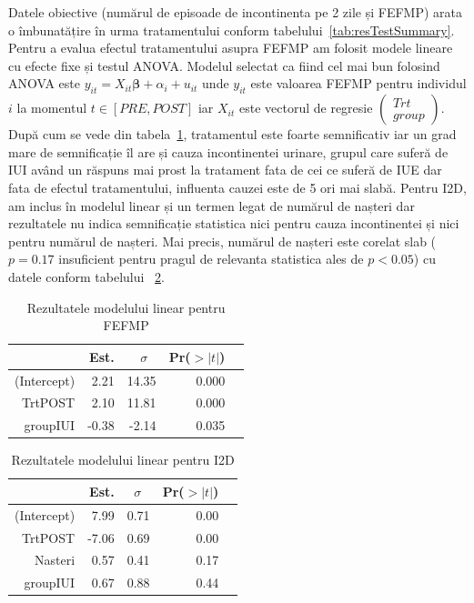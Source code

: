 \documentclass[12pt]{article}
\begin{document}
  Datele obiective (numărul de episoade de incontinenta pe 2 zile și \ac{FEFMP}) arata o îmbunatățire în urma tratamentului conform tabelului~\ref{tab:resTestSummary}. Pentru a evalua efectul tratamentului asupra \ac{FEFMP} am folosit modele lineare cu efecte fixe și testul ANOVA. Modelul selectat ca fiind cel mai bun folosind ANOVA este $y_{it} = X_{it}\mathbf{\beta}+\alpha_{i}+u_{it}$ unde $y_{it}$ este valoarea FEFMP pentru individul $i$ la momentul $t \in [PRE,POST]$ iar $X_{it}$ este vectorul de regresie $\left(\!\begin{array}{c}Trt\\group\end{array}\right)$. După cum se vede din tabela~\ref{tab:resFEFMPlm}, tratamentul este foarte semnificativ iar un grad mare de semnificație îl are și cauza incontinentei urinare, grupul care suferă de \ac{IUI} având un răspuns mai prost la tratament fata de cei ce suferă de \ac{IUE} dar fata de efectul tratamentului, influenta cauzei este de 5 ori mai slabă.
  Pentru I2D, am inclus în modelul linear și un termen legat de numărul de nașteri dar rezultatele nu indica semnificație statistica nici pentru cauza incontinentei și nici pentru numărul de nașteri. Mai precis, numărul de nașteri este corelat slab ($p=0.17$ insuficient pentru pragul de  relevanta statistica ales de $p<0.05$) cu datele conform tabelului~ \ref{tab:resI2Dlm}.
  \begin{table}[H]
		\centering
		\begin{tabular}{rrrrr}
			\hline
			& Est. & $\sigma~~~$ & Pr($>|t|$) \\ \hline
			(Intercept) & 2.21 & 14.35 & 0.000 \\ 
			TrtPOST & 2.10  & 11.81 & 0.000 \\ 
			groupIUI & -0.38 & -2.14 & 0.035 \\ \hline
		\end{tabular}
		\caption{Rezultatele modelului linear pentru FEFMP} 
		\label{tab:resFEFMPlm}
	\end{table}
  
	\begin{table}[H]
		\centering
		\begin{tabular}{rrrrr}
			\hline
			& Est. & $\sigma~~~$ & Pr($>|t|$) \\ \hline
			(Intercept) & 7.99 & 0.71 & 0.00 \\ 
			TrtPOST & -7.06 & 0.69 & 0.00 \\ 
			Nasteri & 0.57 & 0.41 & 0.17 \\
			groupIUI & 0.67 & 0.88 & 0.44 \\ \hline
		\end{tabular}
		\caption{Rezultatele modelului linear pentru I2D} 
		\label{tab:resI2Dlm}
	\end{table}
\end{document}
